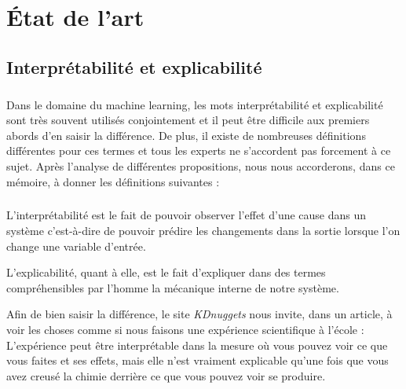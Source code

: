 \chapter{État de l’art}
\section{Interprétabilité et explicabilité}

\paragraph{}Dans le domaine du machine learning, les mots interprétabilité et explicabilité sont très souvent utilisés conjointement et il peut être difficile aux premiers abords d'en saisir la différence. De plus, il existe de nombreuses définitions différentes pour ces termes et tous les experts ne s'accordent pas forcement à ce sujet. Après l'analyse de différentes propositions, nous nous accorderons, dans ce mémoire, à donner les définitions suivantes :

\paragraph{}L'interprétabilité est le fait de pouvoir observer l'effet d'une cause dans un système c'est-à-dire de pouvoir prédire les changements dans la sortie lorsque l'on change une variable d'entrée.\par
L'explicabilité, quant à elle, est le fait d'expliquer dans des termes compréhensibles par l'homme la mécanique interne de notre système.\par
Afin de bien saisir la différence, le site \textit{KDnuggets} nous invite, dans un article\cite{kdInterpre}, à voir les choses comme si nous faisons une expérience scientifique à l'école : L'expérience peut être interprétable dans la mesure où vous pouvez voir ce que vous faites et ses effets, mais elle n'est vraiment explicable qu'une fois que vous avez creusé la chimie derrière ce que vous pouvez voir se produire.

